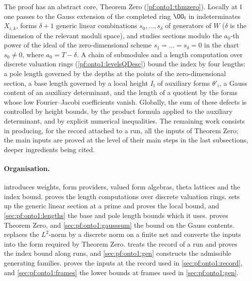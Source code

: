 The proof has an abstract core, Theorem Zero (\cref{pf:onto1:thmzero}). Locally at $\mathfrak l$ one passes to
the Gauss extension of the completed ring $\OO_{\mathfrak l}$ in indeterminates $X_{i,k}$, forms $\delta+1$
generic linear combinations $s_0,\dots,s_\delta$ of generators of $W$ ($\delta$ is the dimension of the
relevant moduli space), and studies sections modulo the $a_0$-th power of the ideal of the
zero-dimensional scheme $s_1=\dots=s_\delta=0$ in the chart $s_0\ne0$, where $a_0=T-\delta$. A chain of
submodules and a length computation over discrete valuation rings (\cref{pf:onto1:levelsQDesc}) bound
the index by four lengths: a pole length governed by the depths at the points of the zero-dimensional
section, a base length governed by a local height $I_{\mathfrak l}$ of auxiliary forms $\theta'_i$, a Gauss
content of an auxiliary determinant, and the length of a quotient by the forms whose low
Fourier--Jacobi coefficients vanish. Globally, the sum of these defects is controlled by height bounds, by
the product formula applied to the auxiliary determinant, and by explicit numerical inequalities. The
remaining work consists in producing, for the record attached to a run, all the inputs of Theorem Zero; the main inputs
are proved at the level of their main steps in the last subsections, deeper ingredients being cited.

\paragraph{Organisation.}  introduces weights, form providers, valued form
algebras, theta lattices and the index bound.  proves the length computations
over discrete valuation rings.  sets up the generic linear section at a prime and
proves the local bound, and \cref{sec:pf:onto1:lengths} the base and pole length bounds which it uses.
 proves Theorem Zero, and \cref{sec:pf:onto1:gausssum} the bound on the Gauss contents.
 replaces the $L^2$-norm by a discrete norm on a finite net and converts the inputs into the form
required by Theorem Zero.  treats the record of a run and proves the index bound along
runs, and \cref{sec:pf:onto1:gen} constructs the admissible generating families.  proves the
inputs at the record used in \cref{sec:pf:onto1:record}, and \cref{sec:pf:onto1:frames} the lower bounds at frames used in
\cref{sec:pf:onto1:gen}.

